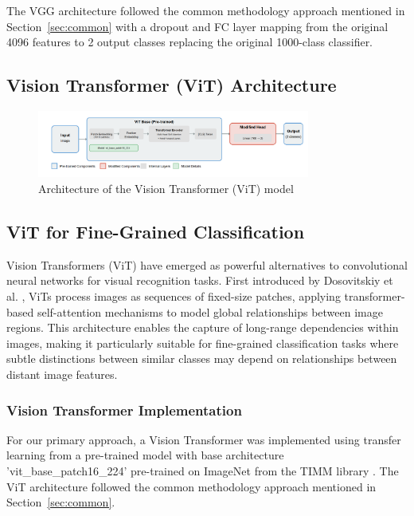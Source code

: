 \documentclass[a4paper,12pt]{report}
\begin{document}
The VGG architecture followed the common methodology approach mentioned in Section~\ref{sec:common} with a dropout and FC layer  mapping from the original 4096 features to 2 output classes replacing the original 1000-class classifier.


\subsection{Vision Transformer (ViT) Architecture}

\begin{figure}[H]
    \centering
    \includegraphics[width=0.8\textwidth]{images/architecture/vit.png}
    \caption{Architecture of the Vision Transformer (ViT) model}
    \label{fig:vit_architecture}
\end{figure}

\subsection{ViT for Fine-Grained Classification}

Vision Transformers (ViT) have emerged as powerful alternatives to convolutional neural networks for visual recognition tasks. First introduced by Dosovitskiy et al. \citep{dosovitskiy2021imageworth16x16words}, ViTs process images as sequences of fixed-size patches, applying transformer-based self-attention mechanisms to model global relationships between image regions. This architecture enables the capture of long-range dependencies within images, making it particularly suitable for fine-grained classification tasks where subtle distinctions between similar classes may depend on relationships between distant image features.

\subsubsection{Vision Transformer Implementation}

For our primary approach, a Vision Transformer was implemented using transfer learning from a pre-trained model with base architecture 'vit\_base\_patch16\_224' pre-trained on ImageNet from the TIMM library \citep{rwightman2021pytorch}. The ViT architecture followed the common methodology approach mentioned in Section~\ref{sec:common}.
\end{document}
